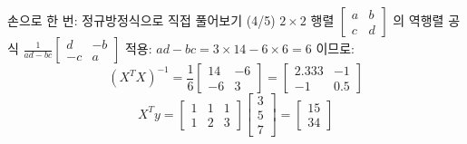\begin{frame}{손으로 한 번: 정규방정식으로 직접 풀어보기 (4/5)}
  $2 \times 2$ 행렬 $\begin{bmatrix}a&b\\c&d\end{bmatrix}$ 의
  역행렬 공식 $\frac{1}{ad-bc}\begin{bmatrix}d&-b\\-c&a\end{bmatrix}$
  적용: $ad-bc = 3\times14-6\times6 = 6$ 이므로:
  \[
  (X^TX)^{-1} = \frac{1}{6}\begin{bmatrix}14&-6\\-6&3\end{bmatrix}
  = \begin{bmatrix}2.333&-1\\-1&0.5\end{bmatrix}
  \]
  \[
  X^Ty = \begin{bmatrix}1&1&1\\1&2&3\end{bmatrix}
  \begin{bmatrix}3\\5\\7\end{bmatrix}
  = \begin{bmatrix}15\\34\end{bmatrix}
  \]
\end{frame}
